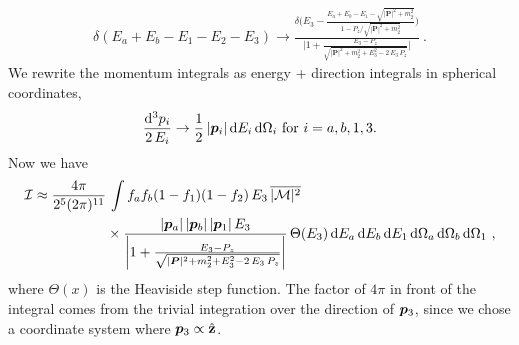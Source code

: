 \begin{align}
    \delta(E_a + E_b - E_1 - E_2 - E_3) 
    \rightarrow 
    \frac{\delta\bigg(
        E_3 -     
        \frac{E_a + E_b - E_1 - \sqrt{|\bm{P}|^2 + m_2^2}}{1 - P_z / \sqrt{|\bm{P}|^2 + m_2^2}}
    \bigg)}
    {
    \bigg|
        1 + \frac{E_3 - P_z}{\sqrt{|\bm{P}|^2 + m_2^2 + E_3^2 - 2 \, E_3 \, P_z}}
    \bigg|
    } \ .
\end{align}
We rewrite the momentum integrals as energy + direction integrals in spherical coordinates, 
\begin{align}
    \frac{\dd^3 p_i}{2 \, E_i} \rightarrow
    \frac{1}{2} \, \pmag[i] \, \dd E_i \, \dd \Omega_i \ \text{for } i = a, b, 1, 3. 
\end{align}
Now we have
\begin{align}
    \label{eq:dumb-approximate-integral}
    \mathcal{I} \approx 
    \frac{4 \pi}{2^5 (2\pi)^{11}} &
    \, \int 
    f_a f_b (1 - f_1) (1 - f_2)
    \, E_3
    \, \overline{|\mathcal{M}|^2} \\
    & \times
    \frac{
        \pmag[a] 
        \, \pmag[b]
        \, \pmag[1]
        \, E_3
        }{
            \bigg|
            1 + \frac{E_3 - P_z}{\sqrt{|\bm{P}|^2 + m_2^2 + E_3^2 - 2 \, E_3 \, P_z}}
            \bigg|
        }
    \, \Theta(E_3)
    \, \dd E_a 
    \, \dd E_b
    \, \dd E_1
    \, \dd \Omega_a
    \, \dd \Omega_b
    \, \dd \Omega_1
    \ ,
\end{align}
where $\Theta(x)$ is the Heaviside step function. The factor of $4\pi$ in front of the integral comes from the trivial integration over the direction of $\pvec[3]$, since we chose a coordinate system where $\pvec[3] \propto \hat{\mathbf{z}}$.
